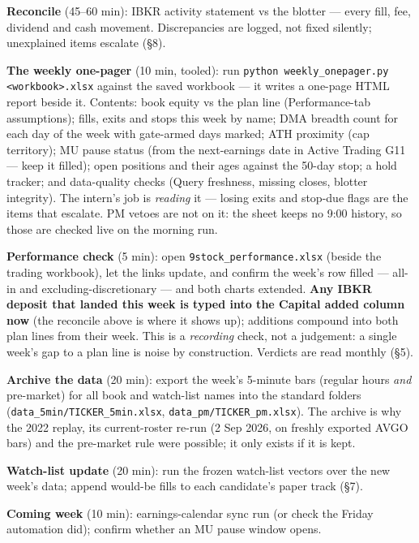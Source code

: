 \documentclass[11pt,a4paper]{article}
\begin{document}
\begin{checklist}
\item \textbf{Reconcile} (45--60 min): IBKR activity statement vs the
      blotter --- every fill, fee, dividend and cash movement. Discrepancies
      are logged, not fixed silently; unexplained items escalate (\S8).
\item \textbf{The weekly one-pager} (10 min, tooled): run
      \texttt{python weekly\_onepager.py <workbook>.xlsx} against the saved
      workbook --- it writes a one-page HTML report beside it. Contents: book
      equity vs the plan line (Performance-tab assumptions); fills, exits and
      stops this week by name; DMA breadth count for each day of the week
      with gate-armed days marked; ATH proximity (cap territory); MU pause
      status (from the next-earnings date in Active Trading G11 --- keep it
      filled); open positions and their ages against the 50-day stop; a hold
      tracker; and data-quality checks (Query freshness, missing closes,
      blotter integrity). The intern's job is \emph{reading} it --- losing
      exits and stop-due flags are the items that escalate. PM vetoes are not
      on it: the sheet keeps no 9:00 history, so those are checked live on
      the morning run.
\item \textbf{Performance check} (5 min): open
      \texttt{9stock\_performance.xlsx} (beside the trading workbook), let
      the links update, and confirm the week's row filled --- all-in and
      excluding-discretionary --- and both charts extended. \textbf{Any IBKR
      deposit that landed this week is typed into the Capital added column
      now} (the reconcile above is where it shows up); additions compound
      into both plan lines from their week. This is a \emph{recording}
      check, not a judgement: a single week's gap to a plan line is noise by
      construction. Verdicts are read monthly (\S5).
\item \textbf{Archive the data} (20 min): export the week's 5-minute bars
      (regular hours \emph{and} pre-market) for all book and watch-list
      names into the standard folders
      (\texttt{data\_5min/TICKER\_5min.xlsx},
      \texttt{data\_pm/TICKER\_pm.xlsx}). The archive is why the 2022 replay,
      its current-roster re-run (2 Sep 2026, on freshly exported AVGO bars)
      and the pre-market rule were possible; it only exists if it is kept.
\item \textbf{Watch-list update} (20 min): run the frozen watch-list vectors
      over the new week's data; append would-be fills to each candidate's
      paper track (\S7).
\item \textbf{Coming week} (10 min): earnings-calendar sync run (or check
      the Friday automation did); confirm whether an MU pause window opens.
\end{checklist}
\end{document}
